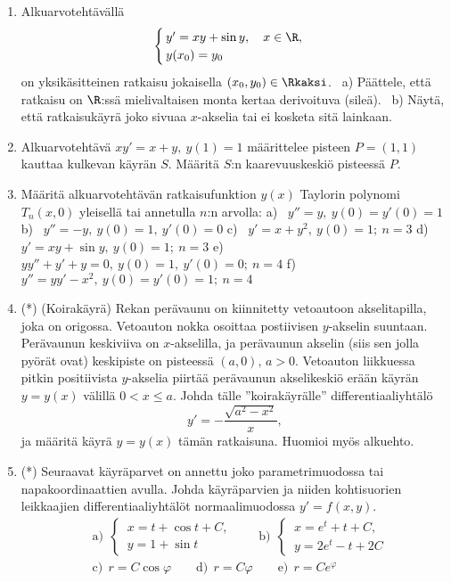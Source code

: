 \begin{enumerate}
\item
Alkuarvotehtävällä
\[
\begin{cases} \,y'=xy+\sin y, \quad x\in\R, \\ \,y(x_0)=y_0 \end{cases}
\]
on yksikäsitteinen ratkaisu jokaisella $(x_0,y_0)\in\Rkaksi$. \ a) Päättele, että ratkaisu
on $\R$:ssä mielivaltaisen monta kertaa derivoituva (sileä). \ b) Näytä, että ratkaisukäyrä
joko sivuaa $x$-akselia tai ei kosketa sitä lainkaan.

\item
Alkuarvotehtävä $xy'=x+y,\ y(1)=1$ määrittelee pisteen $P=(1,1)$ kauttaa kulkevan käyrän $S$.
Määritä $S$:n kaarevuuskeskiö pisteessä $P$.

\item \label{H-dy-1: DY ja Taylor}
Määritä alkuarvotehtävän ratkaisufunktion $y(x)$ Taylorin polynomi $T_n(x,0)$ yleisellä tai 
annetulla $n$:n arvolla: \newline
a) \ $y''=y,\ y(0)=y'(0)=1$ \newline
b) \ $y''=-y,\ y(0)=1,\ y'(0)=0$ \newline
c) \ $y'=x+y^2,\ y(0)=1;\ n=3$ \newline
d) \ $y'=xy+\sin y,\ y(0)=1;\ n=3$ \newline
e) \ $yy''+y'+y=0,\ y(0)=1,\ y'(0)=0;\ n=4$ \newline
f) \ $y''=yy'-x^2,\ y(0)=y'(0)=1;\ n=4$

\item (*) 
(Koirakäyrä) Rekan perävaunu on kiinnitetty vetoautoon akselitapilla, joka on origossa.
Vetoauton nokka osoittaa postiivisen $y$-akselin suuntaan. Perävaunun keskiviiva on
$x$-akselilla, ja perävaunun akselin (siis sen jolla pyörät ovat) keskipiste on pisteessä
$(a,0),\, a > 0$. Vetoauton liikkuessa pitkin positiivista $y$-akselia piirtää perävaunun
akselikeskiö erään käyrän $y=y(x)$ välillä $0<x\le a$. Johda tälle ''koirakäyrälle''
differentiaaliyhtälö
\[
y'=-\frac{\sqrt{a^2-x^2}}{x},
\]
ja määritä käyrä $y=y(x)$ tämän ratkaisuna. Huomioi myös alkuehto.

\item (*)
Seuraavat käyräparvet on annettu joko parametrimuodossa tai napakoordinaattien avulla.
Johda käyräparvien ja niiden kohtisuorien leikkaajien differentiaaliyhtälöt normaalimuodossa
$y'=f(x,y)$.
\begin{align*}
&\text{a)}\ \ \begin{cases} \,x=t+\cos t+C, \\ \,y=1+\sin t \end{cases} \qquad
 \text{b)}\ \ \begin{cases} \,x=e^t+t+C, \\ \,y=2e^t-t+2C \end{cases} \\[2mm]
&\text{c)}\ \ r=C\cos\varphi \qquad
 \text{d)}\ \ r=C\varphi \qquad
 \text{e)}\ \ r=Ce^\varphi
\end{align*}


\end{enumerate}
